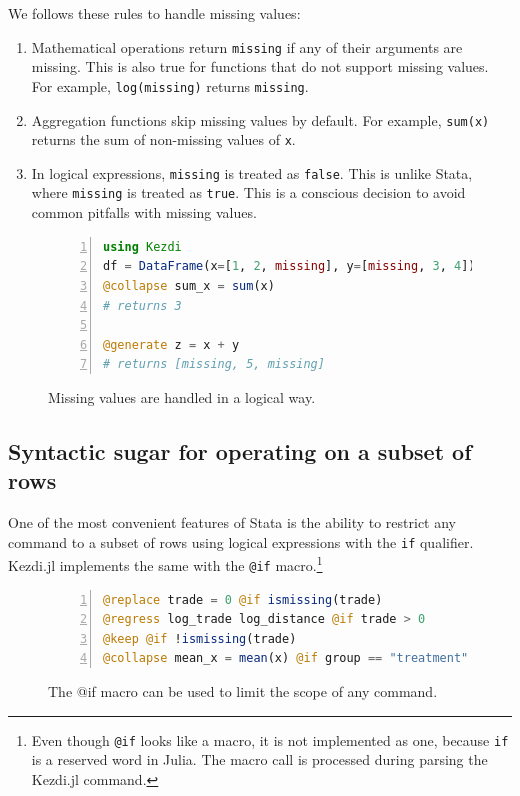 \documentclass{juliacon}
\begin{document}
We follows these rules to handle missing values:
\begin{enumerate}
\item Mathematical operations return \texttt{missing} if any of their arguments are missing. This is also true for functions that do not support missing values. For example, \texttt{log(missing)} returns \texttt{missing}.
\item Aggregation functions skip missing values by default. For example, \texttt{sum(x)} returns the sum of non-missing values of \texttt{x}.
\item In logical expressions, \texttt{missing} is treated as \texttt{false}. This is unlike Stata, where \texttt{missing} is treated as \texttt{true}. This is a conscious decision to avoid common pitfalls with missing values.
\end{enumerate}

\begin{figure}[h!]
\begin{lstlisting}[language = Julia, numbers=left, numberstyle=\tiny\color{gray}]
using Kezdi
df = DataFrame(x=[1, 2, missing], y=[missing, 3, 4])
@collapse sum_x = sum(x)
# returns 3

@generate z = x + y
# returns [missing, 5, missing]
\end{lstlisting}
	
\caption{Missing values are handled in a logical way.}
\label{fig:missing}
\end{figure}

\subsection{Syntactic sugar for operating on a subset of rows}

One of the most convenient features of Stata is the ability to restrict any command to a subset of rows using logical expressions with the \texttt{if} qualifier. Kezdi.jl implements the same with the \texttt{@if} macro.\footnote{Even though \texttt{@if} looks like a macro, it is not implemented as one, because \texttt{if} is a reserved word in Julia. The macro call is processed during parsing the Kezdi.jl command.} 

\begin{figure}[t]
\begin{lstlisting}[language = Julia, numbers=left, numberstyle=\tiny\color{gray}]
@replace trade = 0 @if ismissing(trade)
@regress log_trade log_distance @if trade > 0
@keep @if !ismissing(trade) 
@collapse mean_x = mean(x) @if group == "treatment"		
\end{lstlisting}
\caption{The @if macro can be used to limit the scope of any command.}
\label{fig:ifmacro}
\end{figure}
\end{document}

